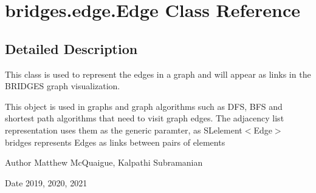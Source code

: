 \hypertarget{classbridges_1_1edge_1_1_edge}{}\section{bridges.\+edge.\+Edge Class Reference}
\label{classbridges_1_1edge_1_1_edge}


\subsection{Detailed Description}
This class is used to represent the edges in a graph and will appear as links in the B\+R\+I\+D\+G\+ES graph visualization. 

This object is used in graphs and graph algorithms such as D\+FS, B\+FS and shortest path algorithms that need to visit graph edges. The adjacency list representation uses them as the generic paramter, as S\+Lelement$<$\+Edge$>$ bridges represents Edges as links between pairs of elements

\begin{DoxyAuthor}{Author}
Matthew Mc\+Quaigue, Kalpathi Subramanian
\end{DoxyAuthor}
\begin{DoxyDate}{Date}
2019, 2020, 2021 
\end{DoxyDate}
